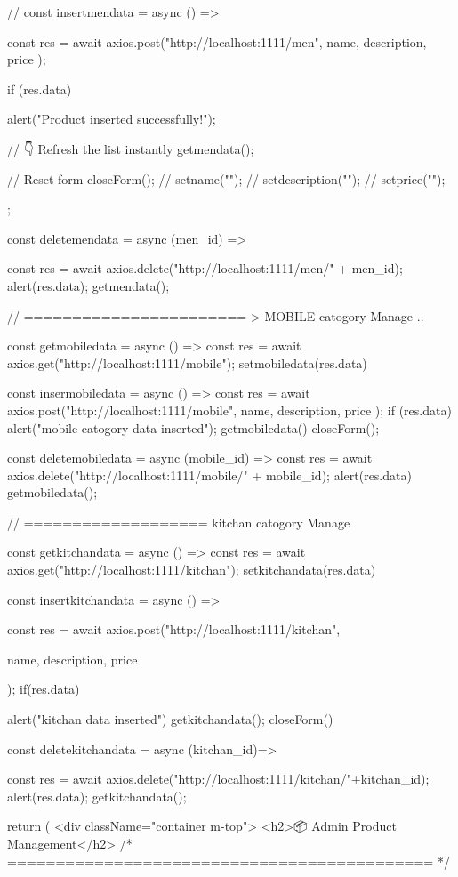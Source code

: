{{  // }
  const insertmendata = async () => {
    const res = await axios.post("http://localhost:1111/men", {
      name, description, price
    });

    if (res.data) {
      alert("Product inserted successfully!");

      // 👇 Refresh the list instantly
      getmendata();

      // Reset form
      closeForm();
      // setname("");
      // setdescription("");
      // setprice("");
    }
  };

  const deletemendata = async (men_id) => {

    const res = await axios.delete("http://localhost:1111/men/" + men_id);
    alert(res.data);
    getmendata();

  }

  // ======================= > MOBILE catogory Manage ..

  const getmobiledata = async () => {
    const res = await axios.get("http://localhost:1111/mobile");
    setmobiledata(res.data)
  }

  const insermobiledata = async () => {
    const res = await axios.post("http://localhost:1111/mobile", {
      name, description, price
    });
    if (res.data) {
      alert("mobile catogory data inserted");
      getmobiledata()
      closeForm();
    }
  }

  const deletemobiledata = async (mobile_id) => {
    const res = await axios.delete("http://localhost:1111/mobile/" + mobile_id);
    alert(res.data)
    getmobiledata();
  }

  // =================== kitchan catogory Manage 

  const getkitchandata = async () => {
    const res = await axios.get("http://localhost:1111/kitchan");
    setkitchandata(res.data)
  }

  const insertkitchandata = async () => {
    const res = await axios.post("http://localhost:1111/kitchan", {
      name, description, price

    });
    if(res.data){
      alert("kitchan data inserted")
      getkitchandata();
      closeForm()

    }

  }
  
  const deletekitchandata = async (kitchan_id)=>{
    const res = await axios.delete("http://localhost:1111/kitchan/"+kitchan_id);
    alert(res.data);
    getkitchandata();

  }

  return (
    <div className="container m-top">
      <h2>📦 Admin Product Management</h2>
      {/* ============================================ */}

}
